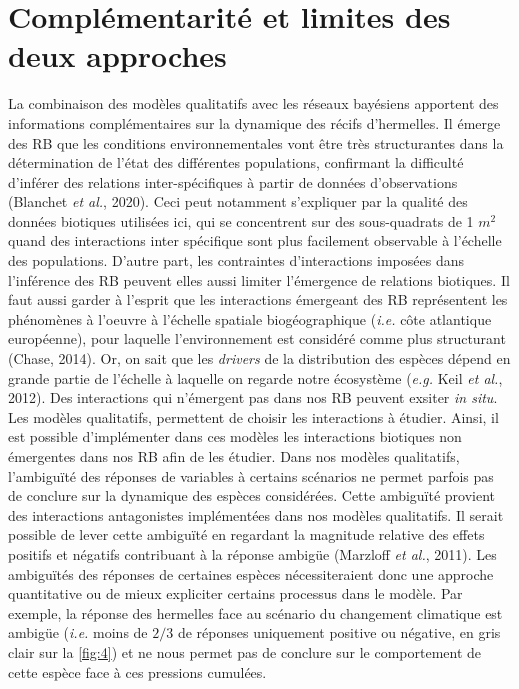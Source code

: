\documentclass[12pt]{report}
\begin{document}
        \section{Complémentarité et limites des deux approches}
La combinaison des modèles qualitatifs avec les réseaux bayésiens apportent des informations complémentaires sur la dynamique des récifs d'hermelles.
Il émerge des RB que les conditions environnementales vont être très structurantes dans la détermination de l'état des différentes populations, confirmant la difficulté d'inférer des relations inter-spécifiques à partir de données d'observations (Blanchet \textit{et al.}, 2020). Ceci peut notamment s'expliquer par la qualité des données biotiques utilisées ici, qui se concentrent sur des sous-quadrats de 1 $m^2$ quand des interactions inter spécifique sont plus facilement observable à l'échelle des populations. D'autre part, les contraintes d'interactions imposées dans l'inférence des RB peuvent elles aussi limiter l'émergence de relations biotiques. Il faut aussi garder à l'esprit que les interactions émergeant des RB représentent les phénomènes à l'oeuvre à l'échelle spatiale biogéographique (\textit{i.e.} côte atlantique européenne), pour laquelle l'environnement est considéré comme plus structurant (Chase, 2014). Or, on sait que les \textit{drivers} de la distribution des espèces dépend en grande partie de l'échelle à laquelle on regarde notre écosystème (\textit{e.g.} Keil \textit{et al.}, 2012). Des interactions qui n'émergent pas dans nos RB peuvent exsiter \textit{in situ}. Les modèles qualitatifs, permettent de choisir les interactions à étudier. Ainsi, il est possible d'implémenter dans ces modèles les interactions biotiques non émergentes dans nos RB afin de les étudier.
\newline \newline
Dans nos modèles qualitatifs, l’ambiguïté des réponses de variables à certains scénarios ne permet parfois pas de conclure sur la dynamique des espèces considérées. Cette ambiguïté provient des interactions antagonistes implémentées dans nos modèles qualitatifs. Il serait possible de lever cette ambiguïté en regardant la magnitude relative des effets positifs et négatifs contribuant à la réponse ambigüe (Marzloff \textit{et al.}, 2011). Les ambiguïtés des réponses de certaines espèces nécessiteraient donc une approche quantitative ou de mieux expliciter certains processus dans le modèle. Par exemple, la réponse des hermelles face au scénario du changement climatique est ambigüe (\textit{i.e.} moins de $2/3$ de réponses uniquement positive ou négative, en gris clair sur la \autoref{fig:4}) et ne nous permet pas de conclure sur le comportement de cette espèce face à ces pressions cumulées.
\end{document}
